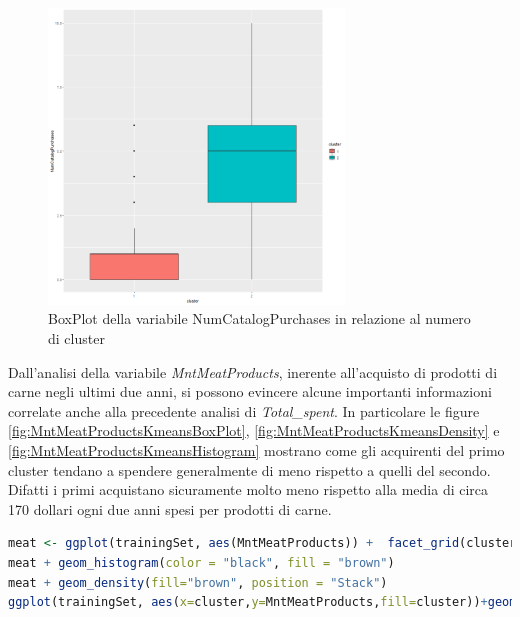 \documentclass[letterpaper,11pt]{article}
\begin{document}
\begin{figure}[H]
    \centering
    \includegraphics[width=0.7\textwidth]{Img/K-MEANS/KMEANS018.png}
    \caption{BoxPlot della variabile NumCatalogPurchases in relazione al numero di cluster}
    \label{fig:NumCatalogPurchasesKmeansBoxPlot}
\end{figure}

Dall'analisi della variabile \textit{MntMeatProducts}, inerente all'acquisto di prodotti di carne negli ultimi due anni, si possono evincere alcune importanti informazioni correlate anche alla precedente analisi di \textit{Total\_spent}. In particolare le figure \ref{fig:MntMeatProductsKmeansBoxPlot}, \ref{fig:MntMeatProductsKmeansDensity} e \ref{fig:MntMeatProductsKmeansHistogram} mostrano come gli acquirenti del primo cluster tendano a spendere generalmente di meno rispetto a quelli del secondo. Difatti i primi acquistano sicuramente molto meno rispetto alla media di circa 170 dollari ogni due anni spesi per prodotti di carne.

\begin{lstlisting}[language=R]
meat <- ggplot(trainingSet, aes(MntMeatProducts)) +  facet_grid(cluster~.)
meat + geom_histogram(color = "black", fill = "brown") 
meat + geom_density(fill="brown", position = "Stack")
ggplot(trainingSet, aes(x=cluster,y=MntMeatProducts,fill=cluster))+geom_boxplot(outlier.colour="black")
\end{lstlisting}
\end{document}
